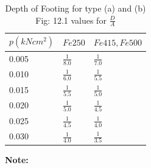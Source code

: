 \documentclass{report}
\begin{document}

\begin{table}
\centering
\label{Table 12.1}
\caption{Depth of Footing for type (a) and (b) Fig: 12.1 values for $\frac{D}{A}$}
\begin{tabular}{ |p{3cm}||p{3cm}|p{3cm}|}
 \hline
 $p(kN cm^2)$ & $Fe 250$ & $Fe 415, Fe 500$\\[0.8 ex]
 \hline
 0.005 &$\frac{1}{8.0}$ &$\frac{1}{7.0}$\\[0.5 ex]
 0.010 &$\frac{1}{6.0}$ &$\frac{1}{5.5}$\\[0.5 ex]
 0.015&$\frac{1}{5.5}$ &$\frac{1}{5.0}$\\[0.5 ex]
 0.020 &$\frac{1}{5.0}$ &$\frac{1}{4.5}$\\[0.5 ex]
 0.025 &$\frac{1}{4.5}$ &$\frac{1}{4.0}$\\[0.5 ex]
 0.030 &$\frac{1}{4.0}$ &$\frac{1}{3.5}$\\[2 ex]
 \hline
  \end{tabular}
\end{table}
\textbf{Note:}
\end{document}
